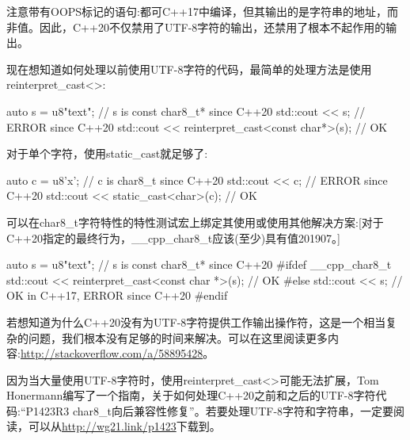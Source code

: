 注意带有OOPS标记的语句:都可C++17中编译，但其输出的是字符串的地址，而非值。因此，C++20不仅禁用了UTF-8字符的输出，还禁用了根本不起作用的输出。


现在想知道如何处理以前使用UTF-8字符的代码，最简单的处理方法是使用reinterpret\_cast<>:

\begin{cpp}
auto s = u8"text"; // s is const char8_t* since C++20
std::cout << s; // ERROR since C++20
std::cout << reinterpret_cast<const char*>(s); // OK
\end{cpp}

对于单个字符，使用static\_cast就足够了:

\begin{cpp}
auto c = u8'x'; // c is char8_t since C++20
std::cout << c; // ERROR since C++20
std::cout << static_cast<char>(c); // OK
\end{cpp}

可以在char8\_t字符特性的特性测试宏上绑定其使用或使用其他解决方案:[对于C++20指定的最终行为，\_\_cpp\_char8\_t应该(至少)具有值201907。]

\begin{cpp}
auto s = u8"text"; // s is const char8_t* since C++20
#ifdef __cpp_char8_t
std::cout << reinterpret_cast<const char *>(s); // OK
#else
std::cout << s; // OK in C++17, ERROR since C++20
#endif
\end{cpp}

若想知道为什么C++20没有为UTF-8字符提供工作输出操作符，这是一个相当复杂的问题，我们根本没有足够的时间来解决。可以在这里阅读更多内容:\url{http://stackoverflow.com/a/58895428}。

因为当大量使用UTF-8字符时，使用reinterpret\_cast<>可能无法扩展，Tom Honermann编写了一个指南，关于如何处理C++20之前和之后的UTF-8字符代码:“P1423R3 char8\_t向后兼容性修复”。若要处理UTF-8字符和字符串，一定要阅读，可以从\url{http://wg21.link/p1423}下载到。


































